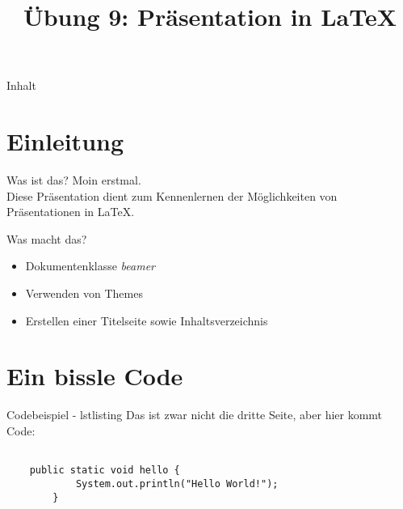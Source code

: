 \documentclass[xetex]{beamer}
\title{Übung 9: Präsentation in \LaTeX}
\begin{document}
\maketitle
\begin{frame}{Inhalt}
    \tableofcontents
\end{frame}

\section{Einleitung}
\begin{frame}{Was ist das?}
    Moin erstmal. \\
    Diese Präsentation dient zum Kennenlernen der Möglichkeiten von Präsentationen in \LaTeX.
\end{frame}

\begin{frame}{Was macht das?}
    \begin{itemize}
        \item Dokumentenklasse \emph{beamer}
        \item Verwenden von Themes
        \item Erstellen einer Titelseite sowie Inhaltsverzeichnis
    \end{itemize}
\end{frame}

\section{Ein bissle Code}
\begin{frame}[fragile]{Codebeispiel - lstlisting}
    Das ist zwar nicht die dritte Seite, aber hier kommt Code:

    \begin{lstlisting}

    public static void hello {
            System.out.println("Hello World!");
        }
    \end{lstlisting}
\end{frame}
\end{document}
